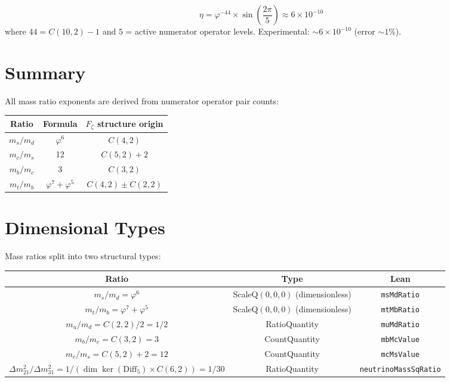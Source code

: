 \begin{theorem}
\label{thm:mass_baryon}
\leanok
\[
\eta = \varphi^{-44} \times \sin\left(\frac{2\pi}{5}\right) \approx 6 \times 10^{-10}
\]
where $44 = C(10,2) - 1$ and $5$ = active numerator operator levels.
Experimental: $\sim 6 \times 10^{-10}$ (error $\sim 1\%$).
\end{theorem}

\section{Summary}
\label{sec:mass_summary}

\begin{theorem}
\label{thm:mass_all_exponents}
\leanok
All mass ratio exponents are derived from numerator operator pair counts:
\begin{center}
\begin{tabular}{|c|c|c|}
\hline
Ratio & Formula & $F_\zeta$ structure origin \\
\hline
$m_s/m_d$ & $\varphi^6$ & $C(4,2)$ \\
$m_c/m_s$ & 12 & $C(5,2) + 2$ \\
$m_b/m_c$ & 3 & $C(3,2)$ \\
$m_t/m_b$ & $\varphi^7 + \varphi^5$ & $C(4,2) \pm C(2,2)$ \\
\hline
\end{tabular}
\end{center}
\end{theorem}

\section{Dimensional Types}
\label{sec:mass_dim}

Mass ratios split into two structural types:

\begin{center}
\begin{tabular}{|c|c|c|}
\hline
Ratio & Type & Lean \\
\hline
$m_s/m_d = \varphi^6$ & ScaleQ$(0,0,0)$ (dimensionless) & \texttt{msMdRatio} \\
$m_t/m_b = \varphi^7 + \varphi^5$ & ScaleQ$(0,0,0)$ (dimensionless) & \texttt{mtMbRatio} \\
$m_u/m_d = C(2,2)/2 = 1/2$ & RatioQuantity & \texttt{muMdRatio} \\
$m_b/m_c = C(3,2) = 3$ & CountQuantity & \texttt{mbMcValue} \\
$m_c/m_s = C(5,2)+2 = 12$ & CountQuantity & \texttt{mcMsValue} \\
$\Delta m^2_{21}/\Delta m^2_{31} = 1/(\dim\ker(\mathrm{Diff}_5) \times C(6,2)) = 1/30$ & RatioQuantity & \texttt{neutrinoMassSqRatio} \\
\hline
\end{tabular}
\end{center}

